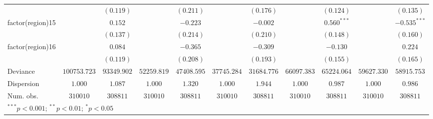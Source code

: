 \begin{tabular}{l c c c c c c c c c c}
                   &                & $(0.119)$      &                & $(0.211)$      &                & $(0.176)$      &                & $(0.124)$      &                & $(0.135)$      \\
factor(region)15   &                & $0.152$        &                & $-0.223$       &                & $-0.002$       &                & $0.560^{***}$  &                & $-0.535^{***}$ \\
                   &                & $(0.137)$      &                & $(0.214)$      &                & $(0.210)$      &                & $(0.148)$      &                & $(0.160)$      \\
factor(region)16   &                & $0.084$        &                & $-0.365$       &                & $-0.309$       &                & $-0.130$       &                & $0.224$        \\
                   &                & $(0.119)$      &                & $(0.208)$      &                & $(0.193)$      &                & $(0.155)$      &                & $(0.165)$      \\
\hline
Deviance           & $100753.723$   & $93349.902$    & $52259.819$    & $47408.595$    & $37745.284$    & $31684.776$    & $66097.383$    & $65224.064$    & $59627.330$    & $58915.753$    \\
Dispersion         & $1.000$        & $1.087$        & $1.000$        & $1.320$        & $1.000$        & $1.944$        & $1.000$        & $0.987$        & $1.000$        & $0.986$        \\
Num. obs.          & $310010$       & $308811$       & $310010$       & $308811$       & $310010$       & $308811$       & $310010$       & $308811$       & $310010$       & $308811$       \\
\hline
\multicolumn{11}{l}{\scriptsize{$^{***}p<0.001$; $^{**}p<0.01$; $^{*}p<0.05$}}
\end{tabular}
